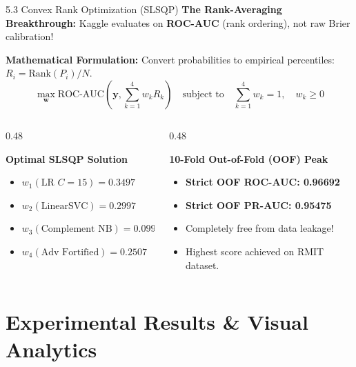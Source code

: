 \documentclass[aspectratio=169]{beamer}
\begin{document}
\begin{frame}{5.3 Convex Rank Optimization (SLSQP)}
\textbf{The Rank-Averaging Breakthrough:} Kaggle evaluates on \textbf{ROC-AUC} (rank ordering), not raw Brier calibration!

\vspace{0.2cm}
\textbf{Mathematical Formulation:} Convert probabilities to empirical percentiles: $R_i = \text{Rank}(P_i) / N$.
$$\max_{\mathbf{w}} \text{ROC-AUC}\left(\mathbf{y}, \sum_{k=1}^4 w_k R_k\right) \quad \text{subject to} \quad \sum_{k=1}^4 w_k = 1, \quad w_k \ge 0$$

\vspace{0.2cm}
\begin{columns}[T]
\begin{column}{0.48\textwidth}
\begin{block}{\textbf{Optimal SLSQP Solution}}
\begin{itemize}
    \item $w_1 (\text{LR } C=15) = \mathbf{0.3497}$
    \item $w_2 (\text{LinearSVC}) = \mathbf{0.2997}$
    \item $w_3 (\text{Complement NB}) = \mathbf{0.0999}$
    \item $w_4 (\text{Adv Fortified}) = \mathbf{0.2507}$
\end{itemize}
\end{block}
\end{column}

\begin{column}{0.48\textwidth}
\begin{block}{\textbf{10-Fold Out-of-Fold (OOF) Peak}}
\begin{itemize}
    \item \textbf{Strict OOF ROC-AUC: 0.96692}
    \item \textbf{Strict OOF PR-AUC: 0.95475}
    \item Completely free from data leakage!
    \item Highest score achieved on RMIT dataset.
\end{itemize}
\end{block}
\end{column}
\end{columns}
\end{frame}

\section{Experimental Results \& Visual Analytics}
\end{document}
